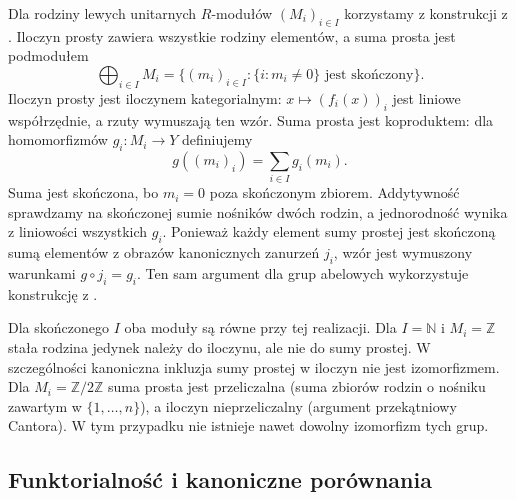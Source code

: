 \begin{przyklad}\label{cat:ex:module-indexed}
Dla rodziny lewych unitarnych $R$-modułów $(M_i)_{i\in I}$ korzystamy z konstrukcji z . Iloczyn prosty zawiera wszystkie rodziny elementów, a suma prosta jest podmodułem
\[
\bigoplus_{i\in I}M_i
=\{(m_i)_{i\in I}:\{i:m_i\ne0\}\text{ jest skończony}\}.
\]
Iloczyn prosty jest iloczynem kategorialnym: $x\mapsto(f_i(x))_i$ jest liniowe współrzędnie, a rzuty wymuszają ten wzór. Suma prosta jest koproduktem: dla homomorfizmów $g_i:M_i\to Y$ definiujemy
\[
g((m_i)_i)=\sum_{i\in I}g_i(m_i).
\]
Suma jest skończona, bo $m_i=0$ poza skończonym zbiorem. Addytywność sprawdzamy na skończonej sumie nośników dwóch rodzin, a jednorodność wynika z liniowości wszystkich $g_i$. Ponieważ każdy element sumy prostej jest skończoną sumą elementów z obrazów kanonicznych zanurzeń $j_i$, wzór jest wymuszony warunkami $g\circ j_i=g_i$. Ten sam argument dla grup abelowych wykorzystuje konstrukcję z .

Dla skończonego $I$ oba moduły są równe przy tej realizacji. Dla $I=\mathbb N$ i $M_i=\mathbb Z$ stała rodzina jedynek należy do iloczynu, ale nie do sumy prostej. W szczególności kanoniczna inkluzja sumy prostej w iloczyn nie jest izomorfizmem. Dla $M_i=\mathbb Z/2\mathbb Z$ suma prosta jest przeliczalna (suma zbiorów rodzin o nośniku zawartym w $\{1,\ldots,n\}$), a iloczyn nieprzeliczalny (argument przekątniowy Cantora). W tym przypadku nie istnieje nawet dowolny izomorfizm tych grup.
\end{przyklad}

\subsection{Funktorialność i kanoniczne porównania}

